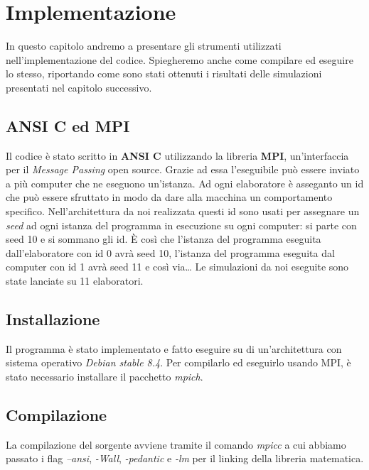 \chapter{Implementazione}
In questo capitolo andremo a presentare gli strumenti utilizzati
nell'implementazione del codice. Spiegheremo anche come compilare ed eseguire lo
stesso, riportando come sono stati ottenuti i risultati delle simulazioni
presentati nel capitolo successivo.



\section{ANSI C ed MPI}
Il codice è stato scritto in \textbf{ANSI C} utilizzando la libreria
\textbf{MPI}, un'interfaccia per il \textit{Message Passing} open source. Grazie
ad essa l'eseguibile può essere inviato a più computer che ne eseguono
un'istanza. Ad ogni elaboratore è asseganto un id che può essere sfruttato in
modo da dare alla macchina un comportamento specifico.\newline
Nell'architettura da noi realizzata questi id sono usati per assegnare un
\textit{seed} ad ogni istanza del programma in esecuzione su ogni computer: si
parte con seed 10 e si sommano gli id. È così che l'istanza del programma
eseguita dall'elaboratore con id 0 avrà seed 10, l'istanza del programma
eseguita dal computer con id 1 avrà seed 11 e così via\dots\newline
Le simulazioni da noi eseguite sono state lanciate su 11 elaboratori.



\section{Installazione}
Il programma è stato implementato e fatto eseguire su di un'architettura con
sistema operativo \textit{Debian stable 8.4}. Per compilarlo ed eseguirlo usando
MPI, è stato necessario installare il pacchetto \textit{mpich}.



\section{Compilazione}
La compilazione del sorgente avviene tramite il comando \textit{mpicc} a cui
abbiamo passato i flag \textit{--ansi}, \textit{-Wall}, \textit{-pedantic} e
\textit{-lm} per il linking della libreria matematica.




